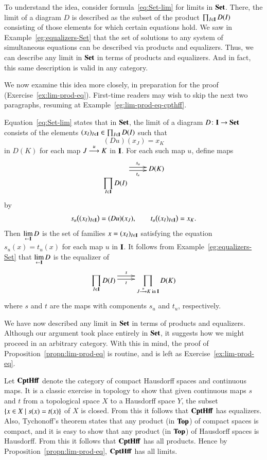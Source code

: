 To understand the idea, consider formula~\eqref{eq:Set-lim} for limits in
$\mathbf{Set}$.  There, the limit of a diagram $D$ is described as the subset of
the product $\prod_{I \in \mathbf{I}} D(I)$ consisting of those elements for
which certain equations hold.  We saw in Example~\ref{eg:equalizers-Set}
that the set of solutions to any system of simultaneous%
%
%
equations can be described via products and equalizers.  Thus, we can
describe any limit in $\mathbf{Set}$ in terms of products and equalizers.  And in
fact, this same description is valid in any category.

We now examine this idea more closely, in preparation for the proof
(Exercise~\ref{ex:lim-prod-eq}).  First-time readers may wish to skip the
next two paragraphs, resuming at Example~\ref{eg:lim-prod-eq-cpthff}.

Equation~\eqref{eq:Set-lim} states that in $\mathbf{Set}$, the limit of a diagram
$D\from \scat{I} \to \Set$ consists of the elements $(x_I)_{I \in \mathbf{I}}
\in \prod_{I \in \mathbf{I}} D(I)$ such that
\[
(Du)(x_J) = x_K 
\]
in $D(K)$ for each map $J \stackrel{u}{\longrightarrow} K$ in $\mathbf{I}$.  For each such map
$u$, define maps
\[
\xymatrix{
\raisebox{-4.5ex}{$\displaystyle \prod_{I \in \scat{I}} D(I)$}
\ar@<.5ex>[r]^-{s_u} \ar@<-.5ex>[r]_-{t_u}      &
D(K)
}
\]
by
\[
s_u\bigl( (x_I)_{I \in \mathbf{I}} \bigr) 
=
(Du)(x_J),
\qquad
t_u\bigl( (x_I)_{I \in \mathbf{I}} \bigr) 
=
x_K.
\]
Then $\lim\limits_{\leftarrow \mathbf{I}} D$ is the set of families $x = (x_I)_{I \in \mathbf{I}}$
satisfying the equation $s_u(x) = t_u(x)$ for each map $u$ in $\mathbf{I}$.
It follows from Example~\ref{eg:equalizers-Set} that $\lim\limits_{\leftarrow \mathbf{I}} D$ is
the equalizer of
\[
\xymatrix{
\displaystyle 
\prod_{I \in \scat{I}} D(I)
\ar@<1.5ex>[r]^-s \ar@<.5ex>[r]_-t      &
\displaystyle
\prod_{J \toby{u} K \text{ in } \scat{I}} D(K)
}
\]
where $s$ and $t$ are the maps with components $s_u$ and $t_u$,
respectively. 

We have now described any limit in $\mathbf{Set}$ in terms of products and
equalizers.  Although our argument took place entirely in $\mathbf{Set}$, it
suggests how we might proceed in an arbitrary category.  With this in mind,
the proof of Proposition~\ref{propn:lim-prod-eq} is routine, and is left as
Exercise~\ref{ex:lim-prod-eq}.

\begin{example}        
\label{eg:lim-prod-eq-cpthff}
Let $\mathbf{CptHff}$%
%
%
%
%
denote the category of compact Hausdorff spa\-ces and continuous maps.  It
is a classic exercise in topology to show that given continuous maps $s$
and $t$ from a topological space $X$ to a Hausdorff space $Y$, the subset
$\{ x \in X \mathrel{|} s(x) = t(x) \}$ of $X$ is closed.  From this it follows
that $\mathbf{CptHff}$ has equalizers.  Also, Tychonoff's theorem states that any
product (in $\mathbf{Top}$) of compact spaces is compact, and it is easy to show
that any product (in $\mathbf{Top}$) of Hausdorff spaces is Hausdorff.  From this it
follows that $\mathbf{CptHff}$ has all products.  Hence by
Proposition~\ref{propn:lim-prod-eq}, $\mathbf{CptHff}$
has all limits.
\end{example}

